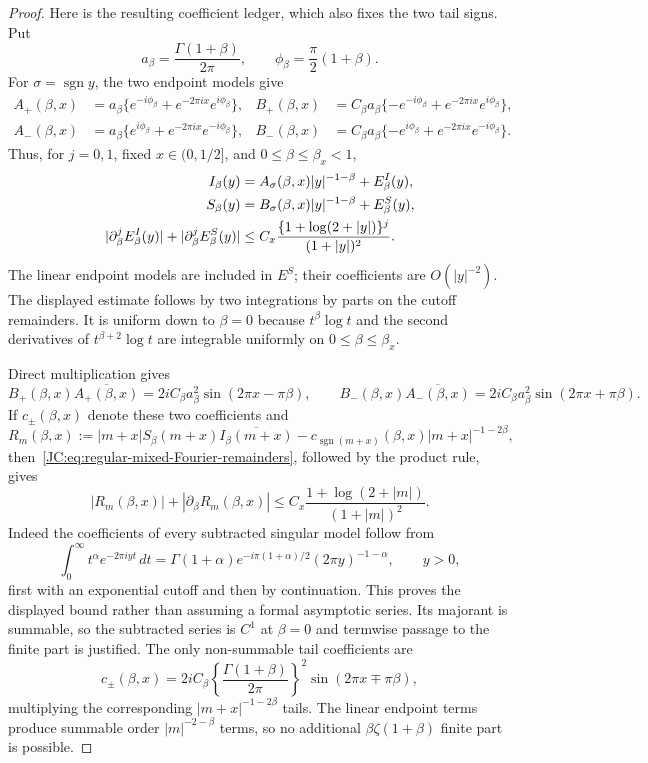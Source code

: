 \begin{proof}
Here is the resulting coefficient ledger, which also fixes the two tail
signs.  Put
\[
 a_\beta=\frac{\Gamma(1+\beta)}{2\pi},\qquad
 \phi_\beta=\frac\pi2(1+\beta).
\]
For $\sigma=\operatorname{sgn}y$, the two endpoint models give
\begin{align*}
 A_+(\beta,x)&=a_\beta
  \{e^{-i\phi_\beta}+e^{-2\pi ix}e^{i\phi_\beta}\},&
 B_+(\beta,x)&=C_\beta a_\beta
  \{-e^{-i\phi_\beta}+e^{-2\pi ix}e^{i\phi_\beta}\},\\
 A_-(\beta,x)&=a_\beta
  \{e^{i\phi_\beta}+e^{-2\pi ix}e^{-i\phi_\beta}\},&
 B_-(\beta,x)&=C_\beta a_\beta
  \{-e^{i\phi_\beta}+e^{-2\pi ix}e^{-i\phi_\beta}\}.
\end{align*}
Thus, for $j=0,1$, fixed $x\in(0,1/2]$, and
$0\le\beta\le\beta_x<1$,
\begin{align}
 I_\beta(y)&=A_\sigma(\beta,x)|y|^{-1-\beta}
             +E^I_\beta(y),\notag\\
 S_\beta(y)&=B_\sigma(\beta,x)|y|^{-1-\beta}
             +E^S_\beta(y),\notag\\
 |\partial_\beta^jE^I_\beta(y)|
 +|\partial_\beta^jE^S_\beta(y)|
 &\le C_x\frac{\{1+\log(2+|y|)\}^{j}}{(1+|y|)^2}.
 \label{JC:eq:regular-mixed-Fourier-remainders}
\end{align}
The linear endpoint models are included in $E^S$; their coefficients are
$O(|y|^{-2})$.  The displayed estimate follows by two integrations by
parts on the cutoff remainders.  It is uniform down to $\beta=0$ because
$t^\beta\log t$ and the second derivatives of
$t^{\beta+2}\log t$ are integrable uniformly on
$0\le\beta\le\beta_x$.

Direct multiplication gives
\[
 B_+(\beta,x)\overline{A_+(\beta,x)}
 =2iC_\beta a_\beta^2\sin(2\pi x-\pi\beta),
 \qquad
 B_-(\beta,x)\overline{A_-(\beta,x)}
 =2iC_\beta a_\beta^2\sin(2\pi x+\pi\beta).
\]
If $c_\pm(\beta,x)$ denote these two coefficients and
\[
 R_m(\beta,x):=|m+x|S_\beta(m+x)\overline{I_\beta(m+x)}
 -c_{\operatorname{sgn}(m+x)}(\beta,x)|m+x|^{-1-2\beta},
\]
then~\eqref{JC:eq:regular-mixed-Fourier-remainders}, followed by the product
rule, gives
\begin{equation}\label{JC:eq:regular-mixed-endpoint-remainder}
 |R_m(\beta,x)|+|\partial_\beta R_m(\beta,x)|
 \le C_x\frac{1+\log(2+|m|)}{(1+|m|)^2}.
\end{equation}
Indeed the coefficients of every subtracted singular model follow from
\[
 \int_0^\infty t^\alpha e^{-2\pi iyt}\,dt
 =\Gamma(1+\alpha)e^{-i\pi(1+\alpha)/2}
  (2\pi y)^{-1-\alpha},\qquad y>0,
\]
first with an exponential cutoff and then by continuation.  This proves
the displayed bound rather than assuming a formal asymptotic series.
Its majorant is summable, so the subtracted series is $C^1$ at
$\beta=0$ and termwise passage to the finite part is justified.  The
only non-summable tail coefficients are
\[
 c_\pm(\beta,x)=2iC_\beta
 \left\{\frac{\Gamma(1+\beta)}{2\pi}\right\}^{\!2}
 \sin(2\pi x\mp\pi\beta),
\]
multiplying the corresponding $|m+x|^{-1-2\beta}$ tails.  The linear
endpoint terms produce summable order $|m|^{-2-\beta}$ terms, so no
additional $\beta\zeta(1+\beta)$ finite part is possible.


\end{proof}
